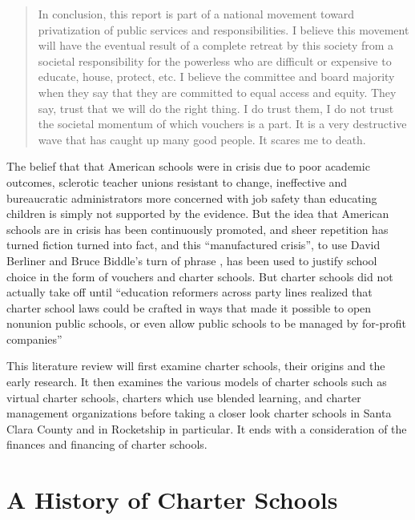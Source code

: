 \begin{quotation}\noindent
\noindent{}In conclusion, this report is part of a national movement toward privatization of public services and responsibilities. I believe this movement will have the eventual result of a complete retreat by this society from a societal responsibility for the powerless who are difficult or expensive to educate, house, protect, etc. I believe the committee and board majority when they say that they are committed to equal access and equity. They say, trust that we will do the right thing. I do trust them, I do not trust the societal momentum of which vouchers is a part. It is a very destructive wave that has caught up many good people. It scares me to death. \parencite[48]{CitizensLeagueEducationAlternativesCommittee1982}
\end{quotation}

The belief that that American schools were in crisis due to poor academic outcomes, sclerotic teacher unions resistant to change, ineffective and bureaucratic administrators more concerned with job safety than educating children is simply not supported by the evidence. But the idea that American schools are in crisis has been continuously promoted, and sheer repetition has turned fiction turned into fact, and this ``manufactured crisis'', to use David Berliner and Bruce Biddle's turn of phrase \parencite{Berliner.Biddle1997}, has been used to justify school choice in the form of vouchers and charter schools. But charter schools did not actually take off until ``education reformers across party lines realized that charter school laws could be crafted in ways that made it possible to open nonunion public schools, or even allow public schools to be managed by for-profit companies'' \parencite[172]{Goldstein2015}

This literature review will first examine charter schools, their origins and the early research. It then examines the various models of charter schools such as virtual charter schools, charters which use blended learning, and charter management organizations before taking a closer look charter schools in Santa Clara County and in Rocketship in particular. It ends with a consideration of the finances and financing of charter schools.

\section{A History of Charter Schools}\label{sec:cs-history}\indent


